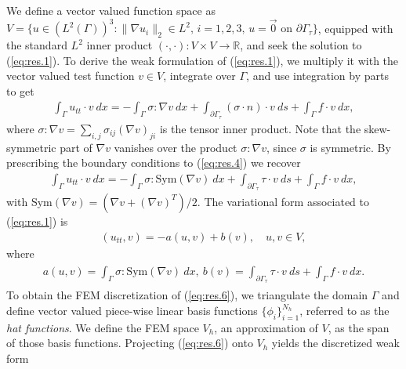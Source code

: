 We define a vector valued function space as $V = \{ u \in (L^2(\Gamma))^3 : \| \nabla u_i \|_2 \in L^2 \text{, } i=1,2,3\text{, } u = \vec 0 \text{ on } \partial \Gamma_\tau \}$, equipped with the standard $L^2$ inner product $(\cdot,\cdot):V\times V \to \mathbb R$, and seek the solution to (\ref{eq:res.1}). To derive the weak formulation of (\ref{eq:res.1}), we multiply it with the vector valued test function $v \in V$, integrate over $\Gamma$, and use integration by parts to get 
\begin{eqnarray}  \label{eq:res.4}
	\int_{\Gamma} u_{tt} \cdot v\ dx = - \int_{\Gamma} \sigma : \nabla v \ dx+ \int_{\partial \Gamma_\tau} (\sigma \cdot n) \cdot v\ ds +  \int_{\Gamma} f \cdot v \ dx,
\end{eqnarray}
where $\sigma : \nabla v = \sum_{i,j}\sigma_{ij}(\nabla v)_{ji}$ is the tensor inner product. Note that the skew-symmetric part of $\nabla v$ vanishes over the product $\sigma : \nabla v$, since $\sigma$ is symmetric. By prescribing the boundary conditions to (\ref{eq:res.4}) we recover
\begin{eqnarray} \label{eq:res.5}
	\int_{\Gamma} u_{tt} \cdot v\ dx = - \int_{\Gamma} \sigma : \text{Sym}(\nabla v) \ dx+ \int_{\partial \Gamma_\tau} \tau \cdot v\ ds +  \int_{\Gamma} f \cdot v \ dx,
\end{eqnarray}
with Sym$(\nabla v) = (\nabla v + (\nabla v)^T)/2$. The variational form associated to (\ref{eq:res.1}) is
\begin{eqnarray} \label{eq:res.6}
	(u_{tt},v) = - a(u,v) + b(v), \quad u,v\in V,
\end{eqnarray}
where
\begin{eqnarray} \label{eq:res.7}
\begin{aligned}
	a(u,v) = \int_{\Gamma} \sigma : \text{Sym}(\nabla v) ~ dx, ~
	b(v) = \int_{\partial \Gamma_\tau} \tau \cdot v ~ ds +  \int_{\Gamma} f \cdot v \ dx.
\end{aligned}
\end{eqnarray}
To obtain the FEM discretization of (\ref{eq:res.6}), we triangulate the domain $\Gamma$ and define vector valued piece-wise linear basis functions $\{\phi_i\}_{i=1}^{N_h}$, referred to as the \emph{hat functions}. We define the FEM space $V_h$, an approximation of $V$, as the span of those basis functions. Projecting (\ref{eq:res.6}) onto $V_h$ yields the discretized weak form

